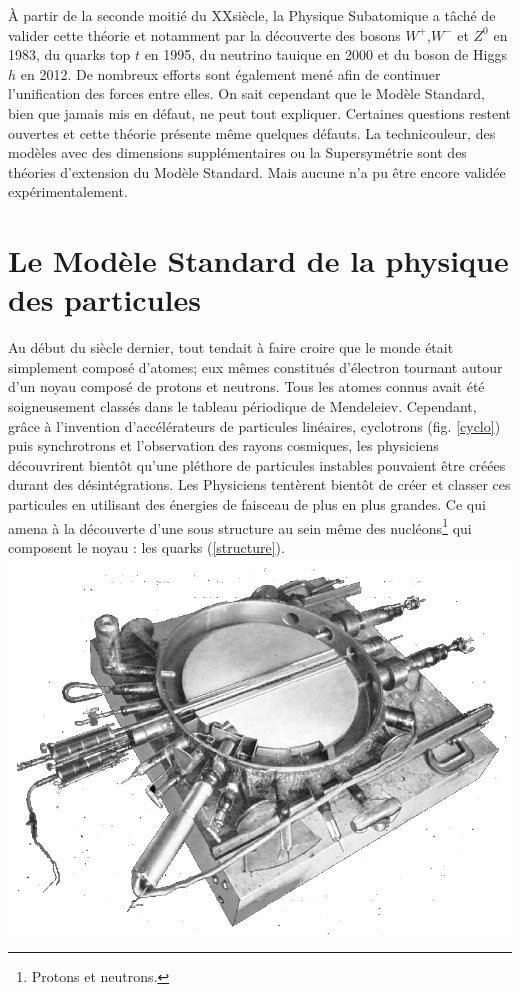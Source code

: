 À partir de la seconde moitié du XX\ieme siècle, la Physique Subatomique a tâché de valider cette théorie et notamment par la découverte des bosons  $W^{+}$,$W^{-}$ et $Z^{0}$ en 1983, du quarks top $t$ en 1995, du neutrino tauique en 2000 et du boson de Higgs $h$ en 2012. De nombreux efforts sont également mené afin de continuer l'unification des forces entre elles. On sait cependant que le Modèle Standard, bien que jamais mis en défaut, ne peut tout expliquer. Certaines questions restent ouvertes et cette théorie présente même quelques défauts. La technicouleur, des modèles avec des dimensions supplémentaires ou la Supersymétrie sont des théories d'extension du Modèle Standard. Mais aucune n'a pu être encore validée expérimentalement.

\section{Le Modèle Standard de la physique des particules}
 
Au début du siècle dernier, tout tendait à faire croire que le monde était simplement composé d'atomes; eux mêmes constitués d'électron tournant autour d'un noyau composé de protons et neutrons. Tous les atomes connus avait été soigneusement classés dans le tableau périodique de Mendeleiev. Cependant, grâce à l'invention d'accélérateurs de particules linéaires, cyclotrons (fig. \ref{cyclo}) puis synchrotrons et l'observation des rayons cosmiques, les physiciens découvrirent bientôt qu'une pléthore de particules instables pouvaient être créées durant des désintégrations. Les Physiciens tentèrent bientôt de créer et classer ces particules en utilisant des énergies de faisceau de plus en plus grandes. Ce qui amena à la découverte d'une sous structure au sein même des nucléons\footnote{Protons et neutrons.} qui composent le noyau : les quarks (\ref{structure}).
\marginpar
{
	\includegraphics[width=\marginparwidth]{SM/cyclotron.png}
    	\label{cyclo}
}

